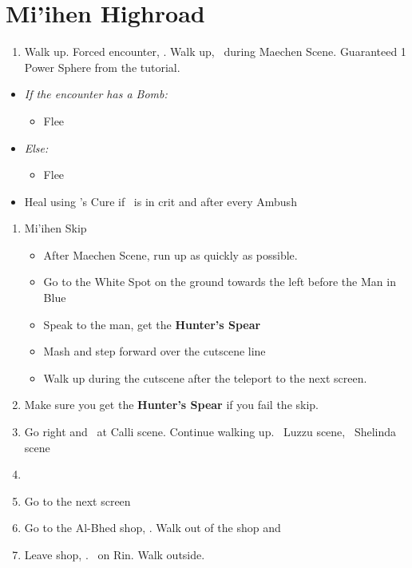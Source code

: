 \chapter{Mi'ihen Highroad}

\begin{enumerate}
	\item Walk up. Forced encounter, \sd. Walk up, \sd\ during Maechen Scene. Guaranteed 1 Power Sphere from the tutorial.
\end{enumerate}
\begin{encounters}
	\begin{itemize}
		\item \textit{If the encounter has a Bomb:}
			\begin{itemize}
				\kimahrif Lancet Bomb, learn \textbf{Self Destruct}
				\item Flee
			\end{itemize}
		\item \textit{Else:}
			\begin{itemize}
				\item Flee
			\end{itemize}
		\item Heal using \yuna's Cure if \tidus\ is in crit and after every Ambush
	\end{itemize}
\end{encounters}
\bothcb\wincb\losscb
\begin{enumerate}[resume]
	\item {Mi'ihen Skip}
		\begin{itemize}
			\item After Maechen Scene, run up as quickly as possible.
			\item Go to the White Spot on the ground towards the left before the Man in Blue
			\item Speak to the man, get the \textbf{Hunter's Spear}
			\item Mash and step forward over the cutscene line
			\item Walk up during the cutscene after the teleport to the next screen.
		\end{itemize}
	\item Make sure you get the \textbf{Hunter's Spear} if you fail the skip.
	\item Go right and \sd\ at Calli scene. Continue walking up. \sd\ Luzzu scene, \sd\ Shelinda scene
	\item \formation{\tidus}{\wakka}{\kimahri}
	\item Go to the next screen
	\item Go to the Al-Bhed shop, \sd. Walk out of the shop and \cs[5:30]
	\item Leave shop, \sd. \sd\ on Rin. Walk outside.
\end{enumerate}
